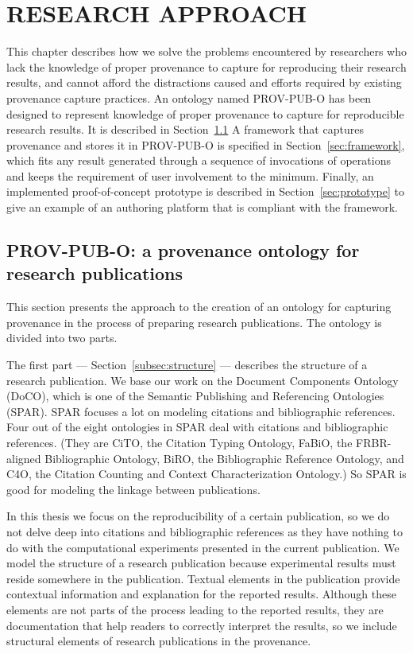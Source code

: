 \chapter{RESEARCH APPROACH}
\label{research-approach}

This chapter describes how we solve the problems encountered by researchers who lack the knowledge of proper provenance to capture for reproducing their research results, and cannot afford the distractions caused and efforts required by existing provenance capture practices. An ontology named PROV-PUB-O has been designed to represent knowledge of proper provenance to capture for reproducible research results. It is described in Section~\ref{sec:ontology} A framework that captures provenance and stores it in PROV-PUB-O is specified in Section~\ref{sec:framework}, which fits any result generated through a sequence of invocations of operations and keeps the requirement of user involvement to the minimum. Finally, an implemented proof-of-concept prototype is described in Section~\ref{sec:prototype} to give an example of an authoring platform that is compliant with the framework.

\section{PROV-PUB-O: a provenance ontology for research publications}
\label{sec:ontology}
This section presents the approach to the creation of an ontology for capturing provenance in the process of preparing research publications. The ontology is divided into two parts. 

The first part --- Section~\ref{subsec:structure} --- describes the structure of a research publication. We base our work on the Document Components Ontology (DoCO), which is one of the Semantic Publishing and Referencing Ontologies (SPAR). SPAR focuses a lot on modeling citations and bibliographic references. Four out of the eight ontologies in SPAR deal with citations and bibliographic references. (They are CiTO, the Citation Typing Ontology, FaBiO, the FRBR-aligned Bibliographic Ontology, BiRO, the Bibliographic Reference Ontology, and C4O, the Citation Counting and Context Characterization Ontology.) So SPAR is good for modeling the linkage between publications. 

In this thesis we focus on the reproducibility of a certain publication, so we do not delve deep into citations and bibliographic references as they have nothing to do with the computational experiments presented in the current publication. We model the structure of a research publication because experimental results must reside somewhere in the publication. Textual elements in the publication provide contextual information and explanation for the reported results. Although these elements are not parts of the process leading to the reported results, they are documentation that help readers to correctly interpret the results, so we include structural elements of research publications in the provenance.

